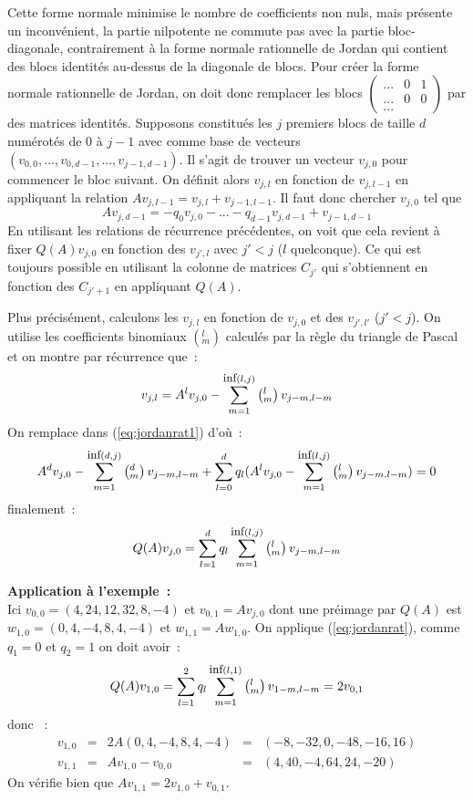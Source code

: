 \documentclass[a4paper,11pt]{article}
\begin{document}
Cette forme normale minimise le nombre de coefficients non nuls,
mais présente un inconvénient, la partie nilpotente ne commute pas
avec la partie bloc-diagonale, contrairement à la forme normale
rationnelle de Jordan qui contient des blocs identités au-dessus
de la diagonale de blocs.
Pour créer la forme normale rationnelle de Jordan, on doit donc remplacer
les blocs $\left( \begin{array}{ccc} ... & 0 & 1 \\ ... & 0 & 0 
\\ ... \end{array} \right)$
par des matrices identit\'es. Supposons constitués les $j$ premiers blocs de
taille $d$ numérotés de 0 à $j-1$ avec comme base de vecteurs
$(v_{0,0},...,v_{0,d-1},...,v_{j-1,d-1})$. 
Il s'agit de trouver un vecteur $v_{j,0}$ pour commencer le bloc
suivant. On définit alors $v_{j,l}$ en fonction de $v_{j,l-1}$
en appliquant la relation $Av_{j,l-1}=v_{j,l}+v_{j-1,l-1}$.
Il faut donc chercher $v_{j,0}$ tel que 
\begin{equation} \label{eq:jordanrat1}
 Av_{j,d-1}=-q_0 v_{j,0}-...-q_{d-1} v_{j,d-1}+v_{j-1,d-1} 
\end{equation}
En utilisant les relations de récurrence précédentes, on voit que
cela revient à fixer $Q(A)v_{j,0}$ en fonction des $v_{j',l}$ avec
$j'<j$ ($l$ quelconque). Ce qui est toujours possible en utilisant
la colonne de matrices $C_{j'}$ qui s'obtiennent en
fonction des $C_{j'+1}$ en appliquant $Q(A)$.

Plus pr\'ecis\'ement, calculons les $v_{j,l}$ en fonction de $v_{j,0}$
et des $v_{j',l'}$ ($j'<j$). On utilise les coefficients binomiaux 
$\left( ^l_m\right)$ calcul\'es par la r\`egle du triangle de Pascal et
on montre par r\'ecurrence que~:
\begin{equation} \label{eq:jordanrat3}
v_{j,l} = A^l v_{j,0} - \sum_{m=1}^{\mbox{\small inf}(l,j)} 
\left( ^l _m\right) v_{j-m,l-m}
\end{equation}
On remplace dans (\ref{eq:jordanrat1}) d'o\`u~:
\[ A^d v_{j,0} - \sum_{m=1}^{\mbox{\small inf}(d,j)} 
\left( ^d _m\right)v_{j-m,l-m}
+ \sum_{l=0}^d 
q_l (A^l v_{j,0} - \sum_{m=1}^{\mbox{\small inf}(l,j)} \left( ^l _m\right) 
v_{j-m,l-m} )=0
\]
finalement~:
\begin{equation} \label{eq:jordanrat}
 Q(A) v_{j,0}= \sum_{l=1}^d 
q_l \sum_{m=1}^{\mbox{\small inf}(l,j)} \left( ^l _m\right) v_{j-m,l-m} 
\end{equation}

{\bf Application \`a l'exemple~:}\\
Ici $v_{0,0}=(4,24,12,32,8,-4)$ et $v_{0,1}=Av_{j,0}$ dont une pr\'eimage
par $Q(A)$ est $w_{1,0}=(0,4,-4,8,4,-4)$ et $w_{1,1}=Aw_{1,0}$.
On applique (\ref{eq:jordanrat}), comme $q_1=0$ et $q_2=1$
on doit avoir~:
\[ Q(A) v_{1,0} = \sum_{l=1}^2
q_l \sum_{m=1}^{\mbox{\small inf}(l,1)} \left( ^l _m\right) v_{1-m,l-m} 
 =2v_{0,1} \]
donc ~:
\[\begin{array}{ccccc}
 v_{1,0}&=&2A(0,4,-4,8,4,-4)&=&(-8,-32,0,-48,-16,16) \\
 v_{1,1}&=&Av_{1,0}-v_{0,0}&=&(4,40,-4,64,24,-20) 
\end{array}
\]
On v\'erifie bien que $Av_{1,1}=2v_{1,0}+v_{0,1}$.
\end{document}

